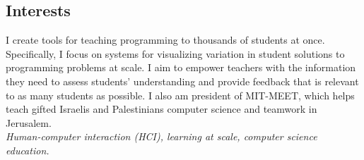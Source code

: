 \documentclass[margin]{res}
\begin{document}
 

 
\address{32 Vassar Street, Rm 32-G715\\Cambridge, MA 02139}
\address{ELG@MIT.edu\\
(215) 694-9631} 

 
\begin{resume} 
 
\section{Interests} 
I create tools for teaching programming to thousands of students at once. Specifically, I focus on systems for visualizing variation in student solutions to programming problems at scale. I aim to empower teachers with the information they need to assess students' understanding and provide feedback that is relevant to as many students as possible. I also am president of MIT-MEET, which helps teach gifted Israelis and Palestinians computer science and teamwork in Jerusalem.\\
{\it Human-computer interaction (HCI), learning at scale, computer science education.}






\end{resume}
\end{document}

